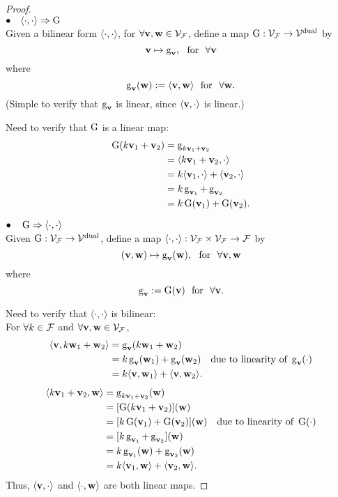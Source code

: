 \begin{proof} \label{proof:bilinear-def-2}
\noindent\\
\noindent $\bullet \quad \langle \cdot, \cdot \rangle \Rightarrow \G$ \\

\noindent Given a bilinear form $\langle \cdot, \cdot \rangle$, for $\forall \vv, \w \in \VF $, define a map $\G: \VF \to \mathcal{V}^\textnormal{dual}$ by
$$ \vv \mapsto \g_{\vv}, ~\ \textnormal{for} ~\ \forall \vv $$
where $$\g_{\vv} (\w) : = \langle \vv, \w \rangle ~\ \textnormal{for} ~\ \forall \w.$$
%
(Simple to verify that $\g_{\vv}$ is linear, since $\langle \vv, \cdot \rangle$ is linear.)

\noindent Need to verify that $\G$ is a linear map:
%
\begin{align*}
    \G (k\vv_1 + \vv_2) &= \g_{k\vv_1 + \vv_2}\\
    &= \langle k\vv_1 + \vv_2, \cdot \rangle \\
    &= k \langle \vv_1, \cdot \rangle + \langle \vv_2, \cdot \rangle \\
    &= k\g_{\vv_1} + \g_{\vv_2} \\
    &= k\G (\vv_1) + \G(\vv_2).
\end{align*}



\noindent $\bullet \quad \G \Rightarrow \langle \cdot, \cdot \rangle$ \\

\noindent Given $\G: \VF \to \mathcal{V}^\textnormal{dual}$, define a map $\langle \cdot, \cdot \rangle: \VF \times \VF \to \F$ by
%
$$ (\vv, \w) \mapsto \g_{\vv}(\w), ~\ \textnormal{for} ~\ \forall \vv, \w $$
%
where $$\g_{\vv} : = \G(\vv) ~\ \textnormal{for} ~\ \forall \vv.$$

\noindent Need to verify that $\langle \cdot, \cdot \rangle$ is bilinear: \\
For $\forall k \in \F$ and $\forall \vv, \w \in \VF$,
%
\begin{align*}
    \langle \vv, k\w_1+\w_2 \rangle &= \g_{\vv}(k\w_1+\w_2)\\
    &=k\g_{\vv}(\w_1) + \g_{\vv}(\w_2) \quad \textnormal{due to linearity of } \g_{\vv}(\cdot)\\ 
    &=k\langle \vv,\w_1 \rangle + \langle \vv,\w_2 \rangle.
\end{align*}
%
\begin{align*}
    \langle k\vv_1+\vv_2, \w \rangle &= \g_{k\vv_1+\vv_2}(\w) \\
    &= [\G(k\vv_1+\vv_2)](\w) \\ 
    &= [k\G(\vv_1) + \G(\vv_2)](\w) \quad \textnormal{due to linearity of } \G(\cdot)\\ 
    &= [k\g_{\vv_1} + \g_{\vv_2}](\w)   \\ 
    &= k\g_{\vv_1}(\w) + \g_{\vv_2}(\w) \\
    &= k\langle \vv_1,\w \rangle + \langle \vv_2,\w \rangle.
\end{align*}
%
Thus, $\langle \vv, \cdot \rangle$ and $\langle \cdot, \w \rangle$ are both linear maps.
\end{proof}


